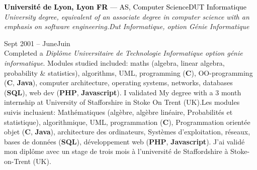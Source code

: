 \documentclass[a4paper]{article}
\newcommand\enfr[2]{\ifdefined\doen#1\else#2\fi\xspace}
\newcommand\cpplang{\textbf{C\raisebox{0.1em}{++}}\xspace}
\newcommand\php{\textbf{PHP}\xspace}
\newcommand\js{\textbf{Javascript}\xspace}
\newcommand\sql{\textbf{SQL}\xspace}
\newcommand\clang{\textbf{C}\xspace}
\newcommand\java{\textbf{Java}\xspace}
\newcommand\entry[2]{\large\textcolor{Black}{\textbf{#1} --- #2}\normalsize}
\newcommand\timespan[2]{\normalsize\textsf{#1 -- #2}}
\begin{document}
\begin{minipage}[t]{0.63\textwidth}
\entry{Université de Lyon, Lyon\enfr{ FR}{}}{\enfr{AS, Computer Science}{DUT Informatique}}\\
\textit{\enfr{University degree, equivalent of an associate degree in computer science with an
emphasis on software engineering.}{Dut Informatique, option Génie Informatique}}

\vspace{0.5em}
\timespan{Sept 2001}{\enfr{June}{Juin} 2003}\\
\enfr{
Completed a \textit{Diplôme Universitaire de Technologie Informatique
  option génie informatique}. Modules studied included: maths
(algebra, linear algebra, probability \& statistics), algorithms, UML,
programming (\clang), OO-programming (\cpplang, \java), computer
architecture, operating systems, networks, databases (\sql), web dev
(\php, \js). I validated My degree with a 3 month internship at
University of Stafforshire in Stoke On Trent (UK).}
  {Les modules suivis incluaient: Mathématiques (algèbre, algèbre
    linéaire, Probabilités et statistique), algorithmique, UML,
    programmation (\clang), Programmation orientée objet (\cpplang,
    \java), architecture des ordinateurs, Systèmes d'exploitation,
    réseaux, bases de données (\sql), développement web (\php,
    \js). J'ai validé mon diplôme avec un stage de trois mois à
    l'université de Staffordshire à Stoke-on-Trent (UK).}

\end{minipage}
\hfill
\end{document}
